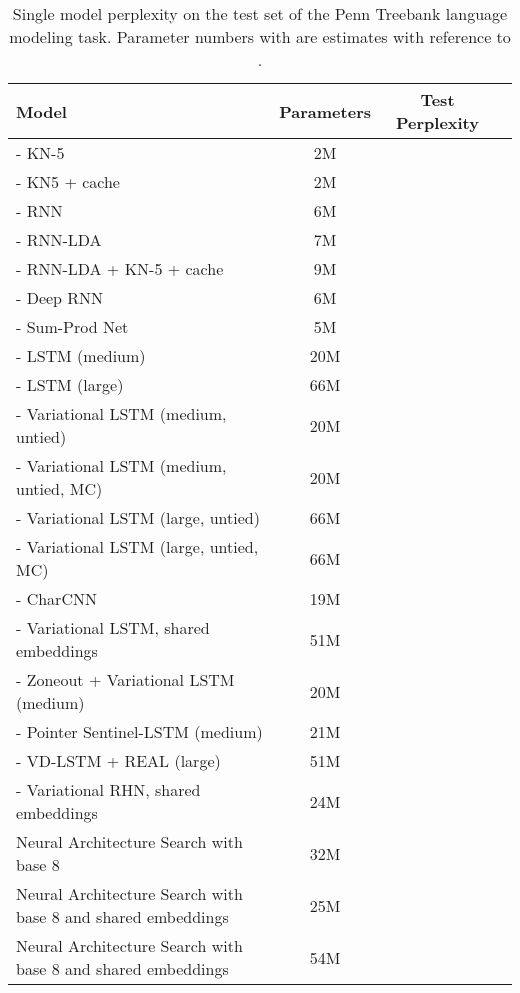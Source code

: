 \documentclass{article} \usepackage{iclr2017_conference,times}
\begin{document}
\begin{table*}[h!]
\center
\begin{small}
\begin{tabular}{l|ccc}
\toprule
\bf Model & \bf Parameters &  \bf Test Perplexity\\
\midrule
\citet{Mikolov2012} - KN-5 & 2M &  \\
\citet{Mikolov2012} - KN5 + cache & 2M &  \\
\citet{Mikolov2012} - RNN & 6M &  \\
\citet{Mikolov2012} - RNN-LDA & 7M &  \\
\citet{Mikolov2012} - RNN-LDA + KN-5 + cache & 9M  &  \\
\citet{Pascanu2013a} - Deep RNN & 6M &  \\
\citet{Cheng2014} - Sum-Prod Net & 5M &  \\
\citet{ZarembaReg} - LSTM (medium) & 20M &  \\
\citet{ZarembaReg} - LSTM (large) & 66M &  \\
\citet{Gal2015} - Variational LSTM (medium, untied) & 20M &  \\
\citet{Gal2015} - Variational LSTM (medium, untied, MC) & 20M &  \\
\citet{Gal2015} - Variational LSTM (large, untied) & 66M  &  \\
\citet{Gal2015} - Variational LSTM (large, untied, MC) & 66M &  \\
\citet{Kim2016} - CharCNN & 19M &  \\
\citet{shareEmbedding} - Variational LSTM, shared embeddings& 51M &  \\
\citet{Socher2016} - Zoneout + Variational LSTM (medium) & 20M &  \\
\citet{Socher2016} - Pointer Sentinel-LSTM (medium) & 21M &  \\
\citet{SocherEmbedding} - VD-LSTM + REAL (large) & 51M &  \\
\citet{Zilly2016} - Variational RHN, shared embeddings & 24M &  \\
\midrule
Neural Architecture Search with base 8 & 32M &  \\
Neural Architecture Search with base 8 and shared embeddings & 25M &  \\
Neural Architecture Search with base 8 and shared embeddings & 54M &  \\
\bottomrule
\end{tabular}
\caption{Single model perplexity on the test set of the Penn Treebank language modeling task. Parameter numbers with  are estimates with reference to \citet{Socher2016}.}
\label{table:PTBwordresults}
\end{small}
\end{table*}
\end{document}
